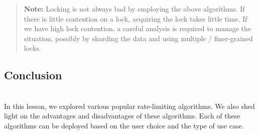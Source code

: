 \begin{quote}
\textbf{Note:} Locking is not always bad by employing the above algorithms. If there is little contention on a lock, acquiring the lock takes little time. If we have high lock contention, a careful analysis is required to manage the situation, possibly by sharding the data and using multiple / finer-grained locks.
\end{quote}
\subsection{Conclusion}\label{P9YYpLdgT0p-eNCZJUvvB}
\\
In this lesson, we explored various popular rate-limiting algorithms. We also shed light on the advantages and disadvantages of these algorithms. Each of these algorithms can be deployed based on the user choice and the type of use case.

